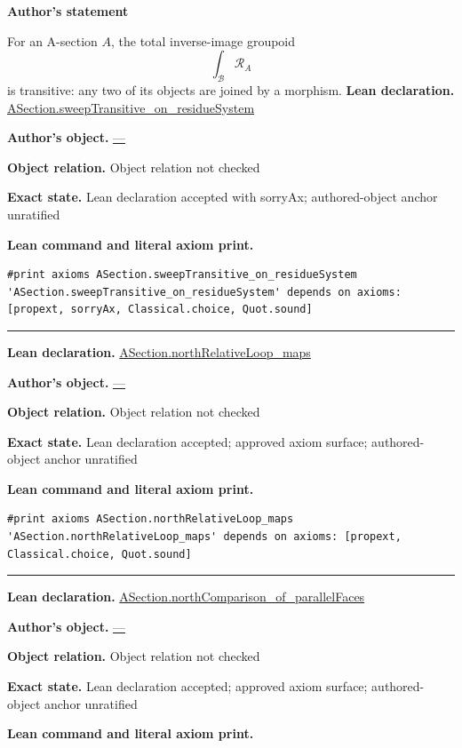 \documentclass[11pt]{article}
\theoremstyle{plain}
\theoremstyle{definition}
\theoremstyle{remark}
\begin{document}
\medskip
\begin{tcolorbox}[provenancecard,title={46. Lemma - Transitivity of the C-residue total},title after break={46. Lemma - Transitivity of the C-residue total (continued)}]
\textbf{Author's statement}\par
For an A-section $A$, the total inverse-image groupoid
\[
  \int_{\mathcal B}\mathcal R_A
\]
is transitive: any two of its objects are joined by a morphism.
\tcblower
\textbf{Lean declaration.} \url{ASection.sweepTransitive_on_residueSystem}
\par\textbf{Author's object.} \url{—}
\par\textbf{Object relation.} Object relation not checked
\par\textbf{Exact state.} Lean declaration accepted with sorryAx; authored-object anchor unratified
\par\smallskip\textbf{Lean command and literal axiom print.}
\begin{Verbatim}[breaklines=true,breakanywhere=true,fontsize=\small]
#print axioms ASection.sweepTransitive_on_residueSystem
'ASection.sweepTransitive_on_residueSystem' depends on axioms: [propext, sorryAx, Classical.choice, Quot.sound]
\end{Verbatim}
\medskip\hrule\medskip
\textbf{Lean declaration.} \url{ASection.northRelativeLoop_maps}
\par\textbf{Author's object.} \url{—}
\par\textbf{Object relation.} Object relation not checked
\par\textbf{Exact state.} Lean declaration accepted; approved axiom surface; authored-object anchor unratified
\par\smallskip\textbf{Lean command and literal axiom print.}
\begin{Verbatim}[breaklines=true,breakanywhere=true,fontsize=\small]
#print axioms ASection.northRelativeLoop_maps
'ASection.northRelativeLoop_maps' depends on axioms: [propext, Classical.choice, Quot.sound]
\end{Verbatim}
\medskip\hrule\medskip
\textbf{Lean declaration.} \url{ASection.northComparison_of_parallelFaces}
\par\textbf{Author's object.} \url{—}
\par\textbf{Object relation.} Object relation not checked
\par\textbf{Exact state.} Lean declaration accepted; approved axiom surface; authored-object anchor unratified
\par\smallskip\textbf{Lean command and literal axiom print.}

\end{tcolorbox}
\end{document}
